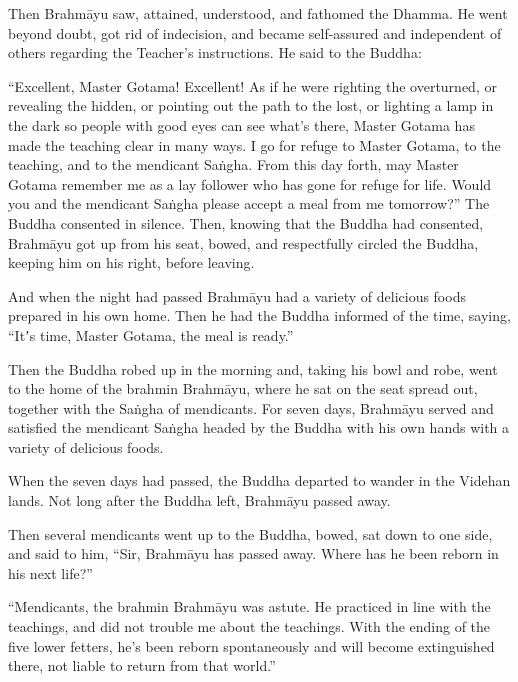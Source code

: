 \documentclass[12pt,openany]{book}%
\begin{document}
Then \textsanskrit{Brahmāyu} saw, attained, understood, and fathomed the Dhamma. He went beyond doubt, got rid of indecision, and became self-assured and independent of others regarding the Teacher’s instructions. He said to the Buddha: 

“Excellent, Master Gotama! Excellent! As if he were righting the overturned, or revealing the hidden, or pointing out the path to the lost, or lighting a lamp in the dark so people with good eyes can see what’s there, Master Gotama has made the teaching clear in many ways. I go for refuge to Master Gotama, to the teaching, and to the mendicant \textsanskrit{Saṅgha}. From this day forth, may Master Gotama remember me as a lay follower who has gone for refuge for life. Would you and the mendicant \textsanskrit{Saṅgha} please accept a meal from me tomorrow?” The Buddha consented in silence. Then, knowing that the Buddha had consented, \textsanskrit{Brahmāyu} got up from his seat, bowed, and respectfully circled the Buddha, keeping him on his right, before leaving. 

And when the night had passed \textsanskrit{Brahmāyu} had a variety of delicious foods prepared in his own home. Then he had the Buddha informed of the time, saying, “Itʼs time, Master Gotama, the meal is ready.” 

Then the Buddha robed up in the morning and, taking his bowl and robe, went to the home of the brahmin \textsanskrit{Brahmāyu}, where he sat on the seat spread out, together with the \textsanskrit{Saṅgha} of mendicants. For seven days, \textsanskrit{Brahmāyu} served and satisfied the mendicant \textsanskrit{Saṅgha} headed by the Buddha with his own hands with a variety of delicious foods. 

When the seven days had passed, the Buddha departed to wander in the Videhan lands. Not long after the Buddha left, \textsanskrit{Brahmāyu} passed away. 

Then several mendicants went up to the Buddha, bowed, sat down to one side, and said to him, “Sir, \textsanskrit{Brahmāyu} has passed away. Where has he been reborn in his next life?” 

“Mendicants, the brahmin \textsanskrit{Brahmāyu} was astute. He practiced in line with the teachings, and did not trouble me about the teachings. With the ending of the five lower fetters, he’s been reborn spontaneously and will become extinguished there, not liable to return from that world.” 
\end{document}
